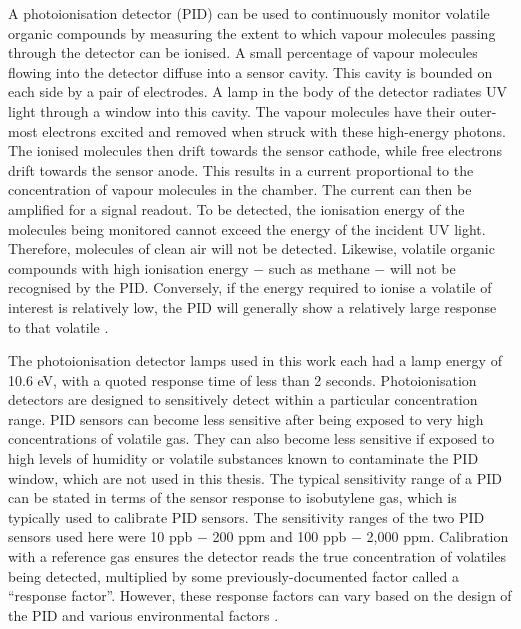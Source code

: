 \documentclass[
  a4paper,
]{scrbook}
\begin{document}
A photoionisation detector (PID) can be used to continuously monitor
volatile organic compounds by measuring the extent to which vapour
molecules passing through the detector can be ionised. A small
percentage of vapour molecules flowing into the detector diffuse into a
sensor cavity. This cavity is bounded on each side by a pair of
electrodes. A lamp in the body of the detector radiates UV light through
a window into this cavity. The vapour molecules have their outer-most
electrons excited and removed when struck with these high-energy
photons. The ionised molecules then drift towards the sensor cathode,
while free electrons drift towards the sensor anode. This results in a
current proportional to the concentration of vapour molecules in the
chamber. The current can then be amplified for a signal readout. To be
detected, the ionisation energy of the molecules being monitored cannot
exceed the energy of the incident UV light. Therefore, molecules of
clean air will not be detected. Likewise, volatile organic compounds
with high ionisation energy \(-\) such as methane \(-\) will not be
recognised by the PID. Conversely, if the energy required to ionise a
volatile of interest is relatively low, the PID will generally show a
relatively large response to that volatile
\autocite{Ionscience,PIDmanual}.

The photoionisation detector lamps used in this work each had a lamp
energy of 10.6 eV, with a quoted response time of less than 2 seconds.
Photoionisation detectors are designed to sensitively detect within a
particular concentration range. PID sensors can become less sensitive
after being exposed to very high concentrations of volatile gas. They
can also become less sensitive if exposed to high levels of humidity or
volatile substances known to contaminate the PID window, which are not
used in this thesis. The typical sensitivity range of a PID can be
stated in terms of the sensor response to isobutylene gas, which is
typically used to calibrate PID sensors. The sensitivity ranges of the
two PID sensors used here were 10 ppb \(-\) 200 ppm and 100 ppb \(-\)
2,000 ppm. Calibration with a reference gas ensures the detector reads
the true concentration of volatiles being detected, multiplied by some
previously-documented factor called a ``response factor''. However,
these response factors can vary based on the design of the PID and
various environmental factors \autocite{Ionscience,PIDmanual}.
\end{document}
